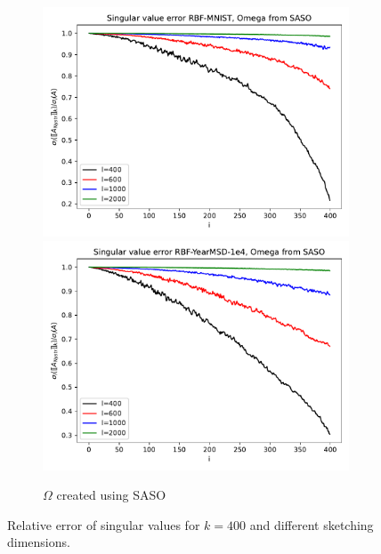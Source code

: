 \documentclass{article}
\theoremstyle{definition}
\begin{document}
\begin{figure}
\begin{subfigure}[t]{0.4\textwidth}
    \includegraphics[width=\textwidth]{plots/singular_values/singular_values_RBF-MNIST_SASO.pdf}
    \includegraphics[width=\textwidth]{plots/singular_values/singular_values_RBF-YearMSD-1e4_SASO.pdf}
    \caption{$\Omega$ created using SASO}
\end{subfigure}\hfill
\caption{Relative error of singular values for $k=400$ and different sketching dimensions.}
\label{fig:singularValueRatios}
\end{figure}


\end{document}
